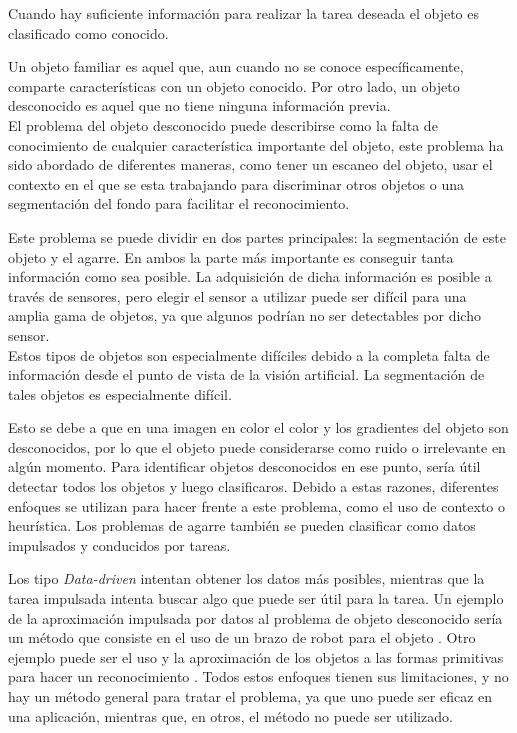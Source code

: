 Cuando hay suficiente información para realizar la tarea deseada el objeto es clasificado como conocido.

Un objeto familiar es aquel que, aun cuando no se conoce específicamente, comparte características con un objeto conocido. Por otro lado, un objeto desconocido es aquel que no tiene ninguna información previa. \\

El problema del objeto desconocido puede describirse como la falta de conocimiento de cualquier característica importante del objeto, este problema ha sido abordado de diferentes maneras, como tener un escaneo del objeto, usar el contexto en el que se esta trabajando para discriminar otros objetos o una segmentación del fondo para facilitar el reconocimiento.

Este problema se puede dividir en dos partes principales: la segmentación de este objeto y el agarre. En ambos la parte más importante es conseguir tanta información como sea posible. La adquisición de dicha información es posible a través de sensores, pero elegir el sensor a utilizar puede ser difícil para una amplia gama de objetos, ya que algunos podrían no ser detectables por dicho sensor. \\

Estos tipos de objetos son especialmente difíciles debido a la completa falta de información desde el punto de vista de la visión artificial. La segmentación de tales objetos es especialmente difícil.

Esto se debe a que en una imagen en color el color y los gradientes del objeto son desconocidos, por lo que el objeto puede considerarse como ruido o irrelevante en algún momento. Para identificar objetos desconocidos en ese punto, sería útil detectar todos los objetos y luego clasificaros. Debido a estas razones, diferentes enfoques se utilizan para hacer frente a este problema, como el uso de contexto o heurística. Los problemas de agarre también se pueden clasificar como datos impulsados ​​y conducidos por tareas.


Los tipo \textit{Data-driven} intentan obtener los datos más posibles, mientras que la tarea impulsada intenta buscar algo que puede ser útil para la tarea. Un ejemplo de la aproximación impulsada por datos al problema de objeto desconocido sería un método que consiste en el uso de un brazo de robot para el objeto \cite{kaneko1994contact}. Otro ejemplo puede ser el uso y la aproximación de los objetos a las formas primitivas para hacer un reconocimiento \cite{fornas2016fitting, felip2009robust, miller2003automatic, huebner2008selection}. Todos estos enfoques tienen sus limitaciones, y no hay un método general para tratar el problema, ya que uno puede ser eficaz en una aplicación, mientras que, en otros, el método no puede ser utilizado.

